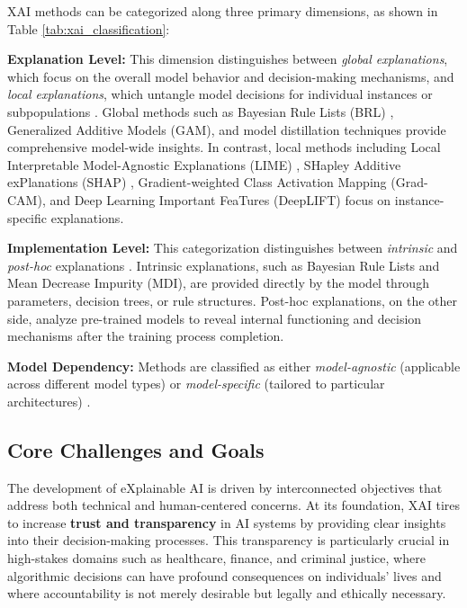 \begin{table}
\begin{adjustbox}{width=\textwidth,center}
\begin{tabular}{|c|cc|cc|cc|}
    \end{tabular}
    \end{adjustbox}
\end{table}


XAI methods can be categorized along three primary dimensions, as shown in Table \ref{tab:xai_classification}:

\textbf{Explanation Level:} This dimension distinguishes between \textit{global explanations}, which focus on the overall model behavior and decision-making mechanisms, and \textit{local explanations}, which untangle model decisions for individual instances or subpopulations \cite{alicioglu2021survey}. Global methods such as Bayesian Rule Lists (BRL) \cite{Letham_2015}, Generalized Additive Models (GAM), and model distillation techniques provide comprehensive model-wide insights. In contrast, local methods including Local Interpretable Model-Agnostic Explanations (LIME) \cite{ribeiro2016should}, SHapley Additive exPlanations (SHAP) \cite{lundberg2017unified}, Gradient-weighted Class Activation Mapping (Grad-CAM), and Deep Learning Important FeaTures (DeepLIFT) focus on instance-specific explanations.

\textbf{Implementation Level:} This categorization distinguishes between \textit{intrinsic} and \textit{post-hoc} explanations \cite{alicioglu2021survey}. Intrinsic explanations, such as Bayesian Rule Lists and Mean Decrease Impurity (MDI), are provided directly by the model through parameters, decision trees, or rule structures. Post-hoc explanations, on the other side, analyze pre-trained models to reveal internal functioning and decision mechanisms after the training process completion.

\textbf{Model Dependency:} Methods are classified as either \textit{model-agnostic} (applicable across different model types) or \textit{model-specific} (tailored to particular architectures) \cite{bodria2023benchmarking}.

\subsection{Core Challenges and Goals}

The development of eXplainable AI is driven by interconnected objectives that address both technical and human-centered concerns. At its foundation, XAI tires to increase \textbf{trust and transparency} in AI systems by providing clear insights into their decision-making processes. This transparency is particularly crucial in high-stakes domains such as healthcare, finance, and criminal justice, where algorithmic decisions can have profound consequences on individuals' lives and where accountability is not merely desirable but legally and ethically necessary.


